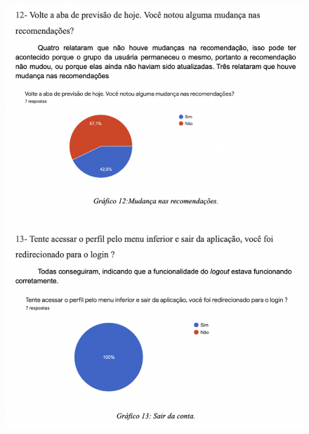 \begin{apendicesenv}
\begin{figure}[ht]
        \includegraphics[keepaspectratio=true,scale=0.8]{figuras/ap7.png}
    \end{figure}
    \begin{figure}[ht]
        \centering

\end{figure}
\end{apendicesenv}
